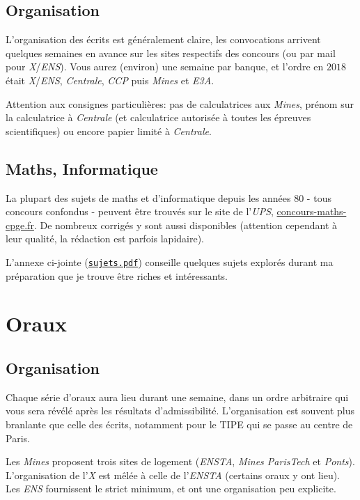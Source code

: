\documentclass{article}
\begin{document}
\subsection{Organisation}
L'organisation des écrits est généralement claire, les convocations arrivent quelques semaines en avance sur les sites respectifs des concours (ou par mail pour \textit{X}/\textit{ENS}).
Vous aurez (environ) une semaine par banque, et l'ordre en $2018$ était \textit{X}/\textit{ENS}, \textit{Centrale}, \textit{CCP} puis \textit{Mines} et \textit{E3A}.

Attention aux consignes particulières: pas de calculatrices aux \textit{Mines}, prénom sur la calculatrice à \textit{Centrale} (et calculatrice autorisée à toutes les épreuves scientifiques) ou encore papier limité à \textit{Centrale}.

\subsection{Maths, Informatique}
La plupart des sujets de maths et d'informatique depuis les années $80$ - tous concours confondus - peuvent être trouvés sur le site de l'\textit{UPS}, \href{https://concours-maths-cpge.fr/}{concours-maths-cpge.fr}.
De nombreux corrigés y sont aussi disponibles (attention cependant à leur qualité, la rédaction est parfois lapidaire).

L'annexe ci-jointe (\href{sujets.pdf}{\texttt{sujets.pdf}}) conseille quelques sujets explorés durant ma préparation que je trouve être riches et intéressants.

\section{Oraux}
\subsection{Organisation}
Chaque série d'oraux aura lieu durant une semaine, dans un ordre arbitraire qui vous sera révélé après les résultats d'admissibilité.
L'organisation est souvent plus branlante que celle des écrits, notamment pour le TIPE qui se passe au centre de Paris.

Les \textit{Mines} proposent trois sites de logement (\textit{ENSTA}, \textit{Mines ParisTech} et \textit{Ponts}).
L'organisation de l'\textit{X} est mêlée à celle de l'\textit{ENSTA} (certains oraux y ont lieu).
Les \textit{ENS} fournissent le strict minimum, et ont une organisation peu explicite.
\end{document}
